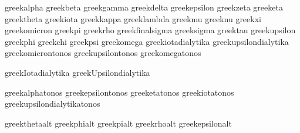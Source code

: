  greekalpha              {}
 greekbeta               {}
 greekgamma              {}
 greekdelta              {}
 greekepsilon            {}
 greekzeta               {}
 greeketa                {}
 greektheta              {}
 greekiota               {}
 greekkappa              {}
 greeklambda             {}
 greekmu                 {}
 greeknu                 {}
 greekxi                 {}
 greekomicron            {}
 greekpi                 {}
 greekrho                {}
 greekfinalsigma         {}
 greeksigma              {}
 greektau                {}
 greekupsilon            {}
 greekphi                {}
 greekchi                {}
 greekpsi                {}
 greekomega              {}
 greekiotadialytika      {}
 greekupsilondialytika   {}
 greekomicrontonos       {}
 greekupsilontonos       {}
 greekomegatonos         {}

 greekIotadialytika          {}
 greekUpsilondialytika       {}

 greekalphatonos             {}
 greekepsilontonos           {}
 greeketatonos               {}
 greekiotatonos              {}
 greekupsilondialytikatonos  {}

 greekthetaalt               {}
 greekphialt                 {}
 greekpialt                  {}
 greekrhoalt                 {}
 greekepsilonalt             {}

\stopencoding

